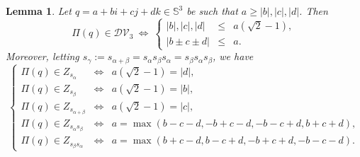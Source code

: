 \documentclass[11pt,twoside]{amsart}
\theoremstyle{plain}
\newtheorem{lem}[prop]{Lemma}
\newcommand{\Sph}{\mathbb{S}}
\begin{document}
\begin{lem}\label{tcube}
Let $q=a+bi+cj+dk\in\Sph^3$ be such that $a\ge|b|,|c|,|d|$. Then
\[\Pi(q)\in\mathcal{DV}_3~\Longleftrightarrow~\left\{\begin{array}{rcl}|b|,|c|,|d| & \le & a(\sqrt{2}-1), \\[.5em] |b\pm c\pm d| & \le & a.\end{array}\right.\]
Moreover, letting $s_\gamma:=s_{\alpha+\beta}=s_\alpha s_\beta s_\alpha=s_\beta s_\alpha s_\beta$, we have
\begin{equation}\label{partial}\tag{$\partial$}
\left\{\begin{array}{rcl}
\Pi(q)\in Z_{s_\alpha} & \Longleftrightarrow & a(\sqrt{2}-1)=|d|, \\[.5em]
\Pi(q)\in Z_{s_\beta} & \Longleftrightarrow & a(\sqrt{2}-1)=|b|, \\[.5em]
\Pi(q)\in Z_{s_{\alpha+\beta}} & \Longleftrightarrow & a(\sqrt{2}-1)=|c|, \\[.5em]
\Pi(q)\in Z_{s_\alpha s_\beta} & \Longleftrightarrow & a=\max(b-c-d,-b+c-d,-b-c+d,b+c+d), \\[.5em]
\Pi(q)\in Z_{s_\beta s_\alpha} & \Longleftrightarrow & a=\max(b+c-d,b-c+d,-b+c+d,-b-c-d).\end{array}\right.
\end{equation}
\end{lem}
\end{document}
